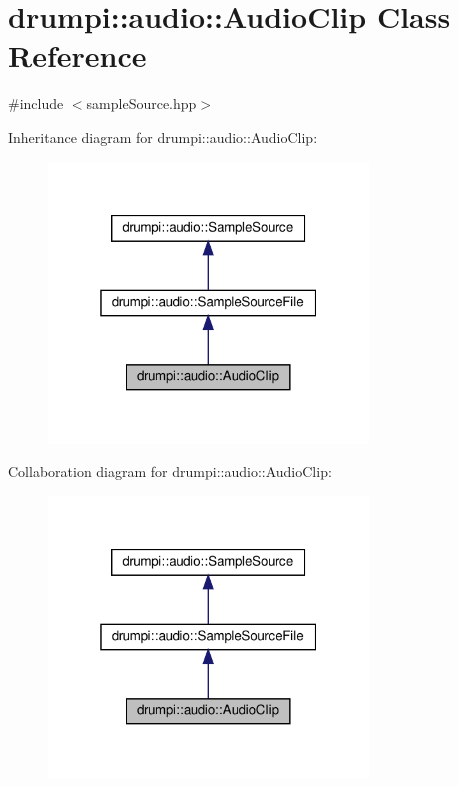 \hypertarget{classdrumpi_1_1audio_1_1AudioClip}{}\section{drumpi\+:\+:audio\+:\+:Audio\+Clip Class Reference}
\label{classdrumpi_1_1audio_1_1AudioClip}


{\ttfamily \#include $<$sample\+Source.\+hpp$>$}



Inheritance diagram for drumpi\+:\+:audio\+:\+:Audio\+Clip\+:
\nopagebreak
\begin{figure}[H]
\begin{center}
\leavevmode
\includegraphics[width=241pt]{classdrumpi_1_1audio_1_1AudioClip__inherit__graph}
\end{center}
\end{figure}


Collaboration diagram for drumpi\+:\+:audio\+:\+:Audio\+Clip\+:
\nopagebreak
\begin{figure}[H]
\begin{center}
\leavevmode
\includegraphics[width=241pt]{classdrumpi_1_1audio_1_1AudioClip__coll__graph}
\end{center}
\end{figure}
